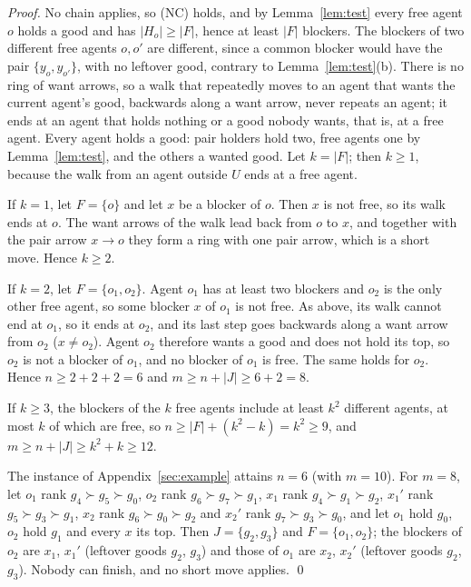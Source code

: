 \documentclass[runningheads,11pt]{llncs}
\begin{document}
\begin{proof}
No chain applies, so (NC) holds, and by Lemma~\ref{lem:test} every free agent $o$ holds a good and has $|H_o|\ge|F|$, hence at least $|F|$ blockers. The blockers of two different free agents $o,o'$ are different, since a common blocker would have the pair $\{y_o,y_{o'}\}$, with no leftover good, contrary to Lemma~\ref{lem:test}(b). There is no ring of want arrows, so a walk that repeatedly moves to an agent that wants the current agent's good, backwards along a want arrow, never repeats an agent; it ends at an agent that holds nothing or a good nobody wants, that is, at a free agent. Every agent holds a good: pair holders hold two, free agents one by Lemma~\ref{lem:test}, and the others a wanted good. Let $k=|F|$; then $k\ge1$, because the walk from an agent outside $U$ ends at a free agent.

If $k=1$, let $F=\{o\}$ and let $x$ be a blocker of $o$. Then $x$ is not free, so its walk ends at $o$. The want arrows of the walk lead back from $o$ to $x$, and together with the pair arrow $x\to o$ they form a ring with one pair arrow, which is a short move. Hence $k\ge2$.

If $k=2$, let $F=\{o_1,o_2\}$. Agent $o_1$ has at least two blockers and $o_2$ is the only other free agent, so some blocker $x$ of $o_1$ is not free. As above, its walk cannot end at $o_1$, so it ends at $o_2$, and its last step goes backwards along a want arrow from $o_2$ ($x\ne o_2$). Agent $o_2$ therefore wants a good and does not hold its top, so $o_2$ is not a blocker of $o_1$, and no blocker of $o_1$ is free. The same holds for $o_2$. Hence $n\ge2+2+2=6$ and $m\ge n+|J|\ge6+2=8$.

If $k\ge3$, the blockers of the $k$ free agents include at least $k^2$ different agents, at most $k$ of which are free, so $n\ge|F|+(k^2-k)=k^2\ge9$, and $m\ge n+|J|\ge k^2+k\ge12$.

The instance of Appendix~\ref{sec:example} attains $n=6$ (with $m=10$). For $m=8$, let $o_1$ rank $g_4\succ g_5\succ g_0$, $o_2$ rank $g_6\succ g_7\succ g_1$, $x_1$ rank $g_4\succ g_1\succ g_2$, $x_1'$ rank $g_5\succ g_3\succ g_1$, $x_2$ rank $g_6\succ g_0\succ g_2$ and $x_2'$ rank $g_7\succ g_3\succ g_0$, and let $o_1$ hold $g_0$, $o_2$ hold $g_1$ and every $x$ its top. Then $J=\{g_2,g_3\}$ and $F=\{o_1,o_2\}$; the blockers of $o_2$ are $x_1$, $x_1'$ (leftover goods $g_2$, $g_3$) and those of $o_1$ are $x_2$, $x_2'$ (leftover goods $g_2$, $g_3$). Nobody can finish, and no short move applies. \qed
\end{proof}
\end{document}

